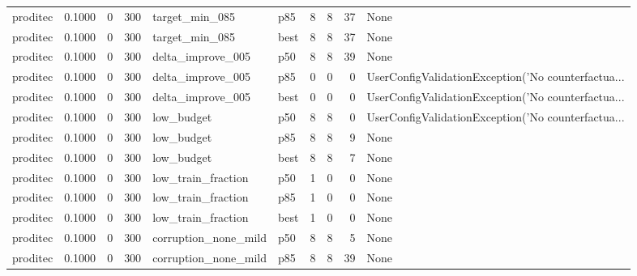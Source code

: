 \begin{tabular}{lrrrllrrrl}
proditec &    0.1000 &    0 &    300 &       target\_min\_085 &    p85 &               8 &          8 &      37 &                                               None \\
proditec &    0.1000 &    0 &    300 &       target\_min\_085 &   best &               8 &          8 &      37 &                                               None \\
proditec &    0.1000 &    0 &    300 &    delta\_improve\_005 &    p50 &               8 &          8 &      39 &                                               None \\
proditec &    0.1000 &    0 &    300 &    delta\_improve\_005 &    p85 &               0 &          0 &       0 & UserConfigValidationException('No counterfactua... \\
proditec &    0.1000 &    0 &    300 &    delta\_improve\_005 &   best &               0 &          0 &       0 & UserConfigValidationException('No counterfactua... \\
proditec &    0.1000 &    0 &    300 &           low\_budget &    p50 &               8 &          8 &       0 & UserConfigValidationException('No counterfactua... \\
proditec &    0.1000 &    0 &    300 &           low\_budget &    p85 &               8 &          8 &       9 &                                               None \\
proditec &    0.1000 &    0 &    300 &           low\_budget &   best &               8 &          8 &       7 &                                               None \\
proditec &    0.1000 &    0 &    300 &   low\_train\_fraction &    p50 &               1 &          0 &       0 &                                               None \\
proditec &    0.1000 &    0 &    300 &   low\_train\_fraction &    p85 &               1 &          0 &       0 &                                               None \\
proditec &    0.1000 &    0 &    300 &   low\_train\_fraction &   best &               1 &          0 &       0 &                                               None \\
proditec &    0.1000 &    0 &    300 & corruption\_none\_mild &    p50 &               8 &          8 &       5 &                                               None \\
proditec &    0.1000 &    0 &    300 & corruption\_none\_mild &    p85 &               8 &          8 &      39 &                                               None \\

\end{tabular}
